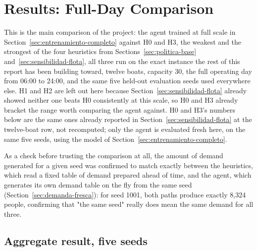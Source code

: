 \documentclass[11pt,a4paper]{article}
\begin{document}
\section{Results: Full-Day Comparison}
\label{sec:comparacion-final}

This is the main comparison of the project: the agent trained at full scale in Section~\ref{sec:entrenamiento-completo} against H0 and H3, the weakest and the strongest of the four heuristics from Sections~\ref{sec:politica-base} and~\ref{sec:sensibilidad-flota}, all three run on the exact instance the rest of this report has been building toward, twelve boats, capacity 30, the full operating day from 06:00 to 24:00, and the same five held-out evaluation seeds used everywhere else. H1 and H2 are left out here because Section~\ref{sec:sensibilidad-flota} already showed neither one beats H0 consistently at this scale, so H0 and H3 already bracket the range worth comparing the agent against. H0 and H3's numbers below are the same ones already reported in Section~\ref{sec:sensibilidad-flota} at the twelve-boat row, not recomputed; only the agent is evaluated fresh here, on the same five seeds, using the model of Section~\ref{sec:entrenamiento-completo}.

As a check before trusting the comparison at all, the amount of demand generated for a given seed was confirmed to match exactly between the heuristics, which read a fixed table of demand prepared ahead of time, and the agent, which generates its own demand table on the fly from the same seed (Section~\ref{sec:demanda-fresca}): for seed 1001, both paths produce exactly 8{,}324 people, confirming that "the same seed" really does mean the same demand for all three.

\subsection{Aggregate result, five seeds}
\end{document}
